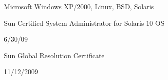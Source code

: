 \documentclass[10pt]{article}
\renewcommand{\section}[2]%
        {\pagebreak[2]\vspace{1.4\baselineskip}%
         \phantomsection\addcontentsline{toc}{section}{#1}%
         \hspace{0in}%
         \marginpar{
         \raggedright \scshape #1}#2}
\renewcommand{\subsection}[2]%
        {\pagebreak[2]\vspace{0.3\baselineskip}%
         \phantomsection\addcontentsline{toc}{subsection}{#1}%
         \hspace{0in}%
         \marginpar{\scriptsize
         \raggedright \scshape #1}#2}
\newcommand{\blankline}{\quad\pagebreak[2]}
\begin{document}
\blankline

 Microsoft Windows XP/2000, Linux, BSD,
        Solaris


Sun Certified System Administrator for Solaris 10 OS


6/30/09

\blankline

Sun Global Resolution Certificate


11/12/2009

\end{document}
